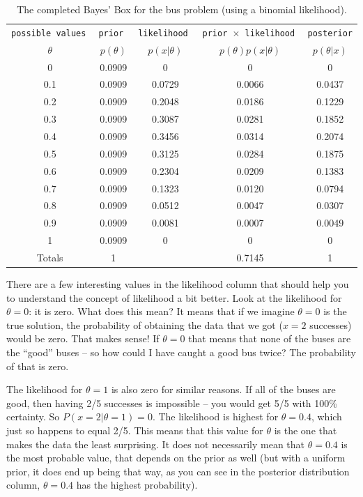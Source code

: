 \begin{table}[ht!]
\begin{center}
\begin{tabular}{|c|c|c|c|c|}
\hline
\tt{possible values} & \tt{prior} & \tt{likelihood} & \tt{prior} $\times$ \tt{likelihood} & \tt{posterior}\\
$\theta$ & $p(\theta)$ & $p(x|\theta)$ & $p(\theta)p(x|\theta)$ & $p(\theta|x)$\\
\hline
0 & 0.0909 & 0 & 0 & 0\\
0.1 & 0.0909 & 0.0729 & 0.0066 & 0.0437\\
0.2 & 0.0909 & 0.2048 & 0.0186 & 0.1229\\
0.3 & 0.0909 & 0.3087 & 0.0281 & 0.1852\\
0.4 & 0.0909 & 0.3456 & 0.0314 & 0.2074\\
0.5 & 0.0909 & 0.3125 & 0.0284 & 0.1875\\
0.6 & 0.0909 & 0.2304 & 0.0209 & 0.1383\\
0.7 & 0.0909 & 0.1323 & 0.0120 & 0.0794\\
0.8 & 0.0909 & 0.0512 & 0.0047 & 0.0307\\
0.9 & 0.0909 & 0.0081 & 0.0007 & 0.0049\\
1 & 0.0909 & 0 & 0 & 0\\
\hline
Totals & 1 & & 0.7145 & 1\\
\hline
\end{tabular}
\caption{The completed Bayes' Box for the bus problem
(using a binomial likelihood).
\label{tab:bus_bayes_box2}}
\end{center}
\end{table}


There are a few interesting values in the likelihood column that should help you
to understand the concept of likelihood a bit better. Look at the likelihood for
$\theta = 0$: it is zero. What does this mean? It means that if we imagine
$\theta=0$ is the true solution, the probability of obtaining the data that we
got ($x=2$ successes) would be zero. That makes sense! If $\theta=0$ that means
that none of the buses are the ``good'' buses -- so how could I have caught a
good bus twice? The probability of that is zero.

The likelihood for $\theta=1$ is also zero for similar reasons. If all of the
buses are good, then having 2/5 successes is impossible -- you would get 5/5
with 100\% certainty. So $P(x=2|\theta=1) = 0$. The likelihood is highest
for $\theta = 0.4$, which just so happens to equal 2/5. This means that this
value for $\theta$ is the one that makes the data the least surprising. It does
not necessarily mean that $\theta=0.4$ is the most probable value, that depends
on the prior as well (but with a uniform prior, it does end up being that way,
as you can see in the posterior distribution column, $\theta=0.4$ has the
highest probability).

